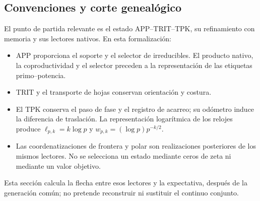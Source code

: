 \subsection{Convenciones y corte genealógico}
\label{gamma-add-sub-32}

El punto de partida relevante es el estado APP--TRIT--TPK, su refinamiento con memoria y sus lectores nativos. En esta formalización:

\begin{itemize}
\item APP proporciona el soporte y el selector de irreducibles. El producto nativo, la coproductividad y el selector preceden a la representación de las etiquetas primo--potencia.
\item TRIT y el transporte de hojas conservan orientación y costura.
\item El TPK conserva el paso de fase y el registro de acarreo; su odómetro induce la diferencia de traslación. La representación logarítmica de los relojes produce \(\ell_{p,k}=k\log p\) y \(w_{p,k}=(\log p)p^{-k/2}\).
\item Las coordenatizaciones de frontera y polar son realizaciones posteriores de los mismos lectores. No se selecciona un estado mediante ceros de zeta ni mediante un valor objetivo.

\end{itemize}
Esta sección calcula la flecha entre esos lectores y la expectativa, después de la generación común; no pretende reconstruir ni sustituir el continuo conjunto.

